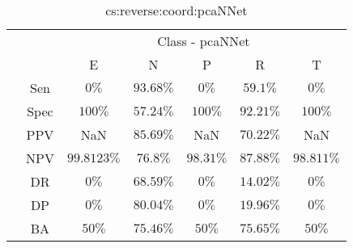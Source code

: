 \begin{table}[!ht]
	\centering
	\begin{tabular}{|c|c|c|c|c|c|c|}
		\cline{3-7}
		\multicolumn{2}{c|}{} & \multicolumn{5}{c|}{Class - pcaNNet} \\ \cline{3-7}
		\multicolumn{2}{c|}{} & E & N & P & R & T \\ \hline
		\multirow{7}{*}{\rotatebox{90}{Statistics}} & Sen & $0\%$ & $93.68\%$ & $0\%$ & $59.1\%$ & $0\%$ \\ \cline{2-7}
		 & Spec & $100\%$ & $57.24\%$ & $100\%$ & $92.21\%$ & $100\%$ \\ \cline{2-7}
		 & PPV & NaN & $85.69\%$ & NaN & $70.22\%$ & NaN \\ \cline{2-7}
		 & NPV & $99.8123\%$ & $76.8\%$ & $98.31\%$ & $87.88\%$ & $98.811\%$ \\ \cline{2-7}
		 & DR & $0\%$ & $68.59\%$ & $0\%$ & $14.02\%$ & $0\%$ \\ \cline{2-7}
		 & DP & $0\%$ & $80.04\%$ & $0\%$ & $19.96\%$ & $0\%$ \\ \cline{2-7}
		 & BA & $50\%$ & $75.46\%$ & $50\%$ & $75.65\%$ & $50\%$ \\ \hline
	\end{tabular}
	\caption{cs:reverse:coord:pcaNNet}
	\label{tab:cs:reverse:coord:pcaNNet}
\end{table}
